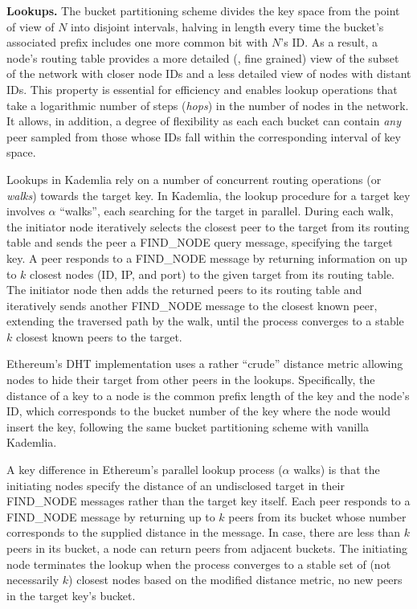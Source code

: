 \smallskip
\noindent
\textbf{Lookups.}
%
The bucket partitioning scheme divides the key space from the point of view of $N$ into disjoint intervals, halving in length every time the bucket's associated prefix includes one more common bit with $N$'s ID.
As a result, a node's routing table provides a more detailed (\ie, fine grained) view of the subset of the network with closer node IDs and a less detailed view of nodes with distant IDs.
This property is essential for efficiency and enables lookup operations that take a logarithmic number of steps (\emph{hops}) in the number of nodes in the network.
It allows, in addition, a degree of flexibility as each each bucket can contain \textit{any} peer sampled from those whose IDs fall within the corresponding interval of key space.

Lookups in Kademlia rely on a number of concurrent routing operations (or \emph{walks}) towards the target key.
In Kademlia, the lookup procedure for a target key involves $\alpha$ ``walks'', each searching for the target in parallel. During each walk, the initiator node iteratively selects the closest peer to the target from its routing table and sends the peer a FIND\_NODE query message, specifying the target key. A peer responds to a FIND\_NODE message by returning information on up to $k$ closest nodes (\ie ID, IP, and port) to the given target from its routing table. The initiator node then adds the returned peers to its routing table and iteratively sends another FIND\_NODE message to the closest known peer, extending the traversed path by the walk, until the process converges to a stable $k$ closest known peers to the target.


Ethereum's DHT implementation uses a rather ``crude'' distance metric allowing nodes to hide their target from other peers in the lookups. Specifically, the distance of a key to a node is the common prefix length of the key and the node's ID, which corresponds to the bucket number of the key where the node would insert the key, following the same bucket partitioning scheme with vanilla Kademlia.

A key difference in Ethereum's parallel lookup process (\ie $\alpha$ walks) is that the initiating nodes specify the distance of an undisclosed target in their FIND\_NODE messages rather than the target key itself. Each peer responds to a FIND\_NODE message by returning up to $k$ peers from its bucket whose number corresponds to the supplied distance in the message. In case, there are less than $k$ peers in its bucket, a node can return peers from adjacent buckets. The initiating node terminates the lookup when the process converges to a stable set of (not necessarily $k$) closest nodes based on the modified distance metric, \ie no new peers in the target key's bucket.

